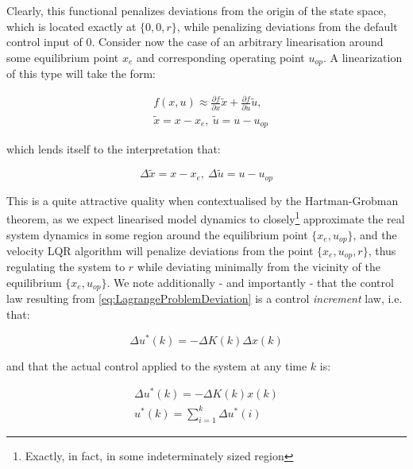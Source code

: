 Clearly, this functional penalizes deviations from the origin of the state space, which is located exactly at $\{0,0,r\}$, while penalizing deviations from the default control input of $0$. Consider now the case of an arbitrary linearisation around some equilibrium point $x_{e}$ and corresponding operating point $u_{op}$. A linearization of this type will take the form:

\begin{equation}\label{eq:LinearizationAroundOP}
	\begin{split}
	&f(x,u) \approx \frac{\partial f}{\partial x} \tilde{x} + \frac{\partial f}{\partial u} \tilde{u}, \\ 
	&\tilde{x} = x-x_e, \ \tilde{u} = u - u_{op}
	\end{split}
\end{equation}

which lends itself to the interpretation that:

\begin{equation}\label{eq:DeltaInterpretation}
	\Delta \tilde{x} = x-x_e, \ \Delta \tilde{u} = u-u_{op}
\end{equation}

\clearpage

This is a quite attractive quality when contextualised by the Hartman-Grobman theorem, as we expect linearised model dynamics to closely\footnote{Exactly, in fact, in some indeterminately sized region} approximate the real system dynamics in some region around the equilibrium point $\{x_e,u_{op}\}$, and the velocity LQR algorithm will penalize deviations from the point $\{x_e,u_{op},r\}$, thus regulating the system to $r$ while deviating minimally from the vicinity of the equilibrium $\{x_e,u_{op}\}$. We note additionally - and importantly - that the control law resulting from \cref{eq:LagrangeProblemDeviation} is a control \textit{increment} law, i.e. that:

\begin{equation}\label{eq:ControlIncrementLaw}
	\Delta u^*(k) = -\Delta K(k) \Delta x(k) 
\end{equation}

and that the actual control applied to the system at any time $k$ is:

\begin{equation}\label{eq:ActualControlApplied}
	\begin{gathered}
		\Delta u^*(k) = -\Delta K(k)x(k) \\
		u^*(k) = \sum_{i=1}^{k} \Delta u^*(i)
	\end{gathered}
\end{equation}

